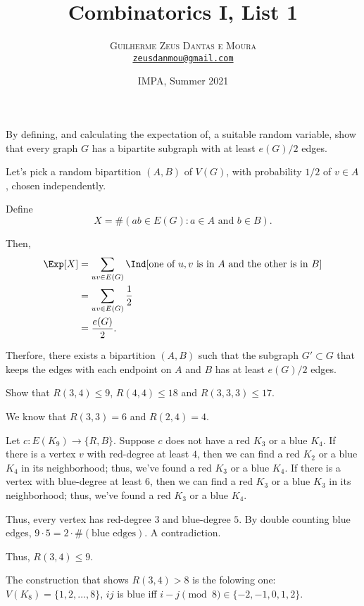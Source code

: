 \documentclass[10pt, a4paper]{article}
\title{\textbf{\textsf{Combinatorics I, List 1}}}
\author{\textsc{Guilherme Zeus Dantas e Moura}\\[2pt]\href{mailto:zeusdanmou@gmail.com}{\texttt{zeusdanmou@gmail.com}}}
\date{IMPA, Summer 2021}
\begin{document}
\maketitle

\begin{prob}
	By defining, and calculating the expectation of, a suitable random variable, show that every graph $G$ has a bipartite subgraph with at least $e(G)/2$ edges.
\end{prob}
\begin{sol}
	Let's pick a random bipartition $(A, B)$ of $V(G)$, with probability $1/2$ of $v \in A$, chosen independently.

	Define \[
		X = \#\left( ab \in E(G) : a \in A \text{ and } b \in B\right).
	\]

	Then,
	\begin{align*}
		\Exp[X] &= \sum_{uv \in E(G)} \Ind[\text{one of $u, v$ is in $A$ and the other is in $B$}]\\
				&= \sum_{uv \in E(G)} \frac{1}{2}\\
				&= \frac{e(G)}{2}.
	\end{align*}

	Therfore, there exists a bipartition $(A, B)$ such that the subgraph $G' \subset G$ that keeps the edges with each endpoint on $A$ and $B$ has at least $e(G)/2$ edges.
\end{sol}

\newpage
\begin{prob}\label{prob:2}
	Show that $R(3, 4) \leqslant 9$, $R(4, 4) \leqslant 18$ and $R(3, 3, 3) \leqslant 17$.
\end{prob}
\begin{sol}
	We know that $R(3, 3) = 6$ and  $R(2, 4) = 4$.

	Let $c: E(K_9) \to \{R, B\}$. Suppose $c$ does not have a red $K_3$ or a blue $K_4$.
	If there is a vertex $v$ with red-degree at least $4$, then we can find a red $K_2$ or a blue $K_4$ in its neighborhood; thus, we've found a red $K_3$ or a blue $K_4$. If there is a vertex with blue-degree at least $6$, then we can find a red $K_3$ or a blue $K_3$ in its neighborhood; thus, we've found a red $K_3$ or a blue $K_4$.

	Thus, every vertex has red-degree $3$ and blue-degree $5$. By double counting blue edges, $9\cdot5 = 2 \cdot \#(\text{blue edges})$. A contradiction.

	Thus, $R(3, 4) \le 9$.

	The construction that shows $R(3, 4) > 8$ is the folowing one: $V(K_8) = \{1, 2, \dots, 8\}$, $ij$ is blue iff $i-j \pmod{8} \in \{-2, -1, 0, 1, 2\}$.
\end{sol}
\end{document}
